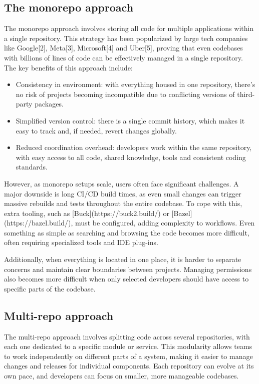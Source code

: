 \documentclass{article}
\begin{document}
  \subsection{The monorepo approach}

  The monorepo approach involves storing all code for multiple applications within
  a single repository. This strategy has been popularized by large tech companies
  like Google[2], Meta[3], Microsoft[4] and Uber[5], proving that even codebases
  with billions of lines of code can be effectively managed in a single
  repository. The key benefits of this approach include:

  \begin{itemize}
    \item Consistency in environment: with everything housed in one repository, there's
    no risk of projects becoming incompatible due to conflicting versions of
    third-party packages.
    \item Simplified version control: there is a single commit history, which makes it
    easy to track and, if needed, revert changes globally.
  \item Reduced coordination overhead: developers work within the same repository,
    with easy access to all code, shared knowledge, tools and consistent coding
    standards.
  \end{itemize}

  However, as monorepo setups scale, users often face significant challenges. A
  major downside is long CI/CD build times, as even small changes can trigger
  massive rebuilds and tests throughout the entire codebase. To cope with this,
  extra tooling, such as [Buck](https://buck2.build/) or
  [Bazel](https://bazel.build/), must be configured, adding complexity to
  workflows. Even something as simple as searching and browsing the code becomes
  more difficult, often requiring specialized tools and IDE plug-ins.

  Additionally, when everything is located in one place, it is harder to separate
  concerns and maintain clear boundaries between projects. Managing permissions
  also becomes more difficult when only selected developers should have access to
  specific parts of the codebase.

\subsection{Multi-repo approach}

The multi-repo approach involves splitting code across several repositories,
with each one dedicated to a specific module or service. This modularity allows
teams to work independently on different parts of a system, making it easier to
manage changes and releases for individual components. Each repository can
evolve at its own pace, and developers can focus on smaller, more manageable
codebases.
\end{document}
